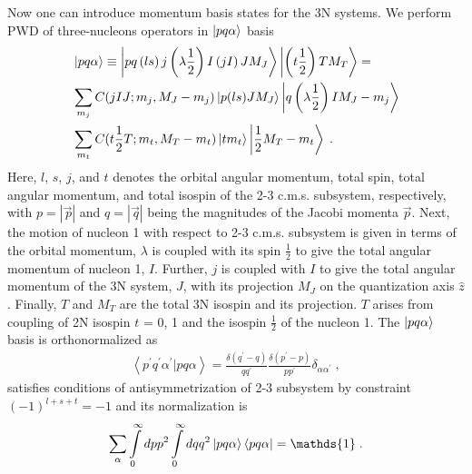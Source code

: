 Now one can introduce momentum basis states for the 3N systems. 
We perform PWD of three-nucleons operators in $\ket{pq\alpha}$ basis
\begin{equation}
\begin{split}
&\ket{p q \alpha} \equiv \ket{pq \left(ls\right)j\left(\lambda\frac{1}{2}\right)I\left(j I\right)JM_{J}} \ket{\left(t\frac{1}{2}\right)TM_{T}}= \\
&\sum\limits_{m_{j}}C(jIJ;m_{j}, M_{J} - m_{j})\ket{p(ls)JM_{J}}\ket{q\left(\lambda\frac{1}{2}\right)I M_{J} - m_{j}}\\
&\sum\limits_{m_{t}}C(t\frac{1}{2}T;m_{t},M_{T} - m_{t})\ket{tm_{t}}\ket{\frac{1}{2}M_{T} - m_{t}}\;.
\end{split}
\label{pqalpha}
\end{equation}
Here, $l$, $s$, $j$, and $t$ denotes the orbital angular momentum, total spin, total angular momentum, and total isospin of the 2-3 c.m.s. subsystem, respectively, with $p = |\!\vec{\,p}|$ and $q = |\!\vec{\, q}|$ being the magnitudes of the Jacobi momenta $\vec{p}$.
Next, the motion of nucleon 1 with respect to 2-3 c.m.s. subsystem is given in terms of the orbital momentum, $\lambda$ is coupled with its spin $\frac{1}{2}$ to give the total angular momentum of nucleon 1, $I$. Further, $j$ is coupled with $I$ to give the total angular momentum of the 3N system, $J$, with its projection $M_{J}$ on the quantization axis $\hat{z}$. Finally, $T$ and $M_{T}$ are the total 3N isospin and its projection. $T$ arises from coupling of 2N isospin $t$ = 0, 1 and the isospin $\frac{1}{2}$ of the nucleon 1. The $\ket{pq\alpha}$ basis is orthonormalized as
\begin{equation}
\begin{split}
\left<p^{\prime}q^{\prime}\alpha^{\prime}|pq\alpha\right> = \frac{\delta (q^{\prime} - q)}{qq^{\prime}}\frac{\delta (p^{\prime} - p)}{pp^{\prime}}\delta_{\alpha\alpha^{\prime}}\;,
\end{split}
\end{equation}
satisfies conditions of antisymmetrization of 2-3 subsystem by constraint $(-1)^{l+s+t} = -1$ and its normalization is
\begin{equation}
\sum\limits_{\alpha}\int\limits_{0}^{\infty}dp p^{2}\int\limits_{0}^{\infty}dq q^{2}\ket{pq\alpha}\bra{pq\alpha} = \mathds{1}\;.
\end{equation}

